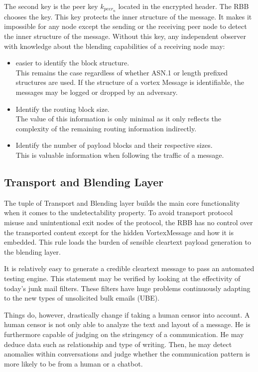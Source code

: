 \documentclass[10pt,journal,compsoc]{IEEEtran}
\begin{document}
The second key is the peer key $k_{peer_n}$ located in the encrypted header. The RBB chooses the key. This key protects the inner structure of the message. It makes it impossible for any node except the sending or the receiving peer node to detect the inner structure of the message. Without this key, any independent observer with knowledge about the blending capabilities of a receiving node may:
\begin{itemize}
	\item easier to identify the block structure.\\ 
	This remains the case regardless of whether ASN.1 or length prefixed structures are used. If the structure of a vortex Message is identifiable, the messages may be logged or dropped by an adversary.
	\item Identify the routing block size.\\
	The value of this information is only minimal as it only reflects the complexity of the remaining routing information indirectly.
	\item Identify the number of payload blocks and their respective sizes. \\
	This is valuable information when following the traffic of a message.
\end{itemize}

\subsection{Transport and Blending Layer\label{sec:transportAndBlending}}
The tuple of Transport and Blending layer builds the main core functionality when it comes to the undetectability property. To avoid transport protocol misuse and unintentional exit nodes of the protocol, the RBB has no control over the transported content except for the hidden VortexMessage and how it is embedded. This rule loads the burden of sensible cleartext payload generation to the blending layer. 

It is relatively easy to generate a credible cleartext message to pass an automated testing engine. This statement may be verified by looking at the effectivity of today's junk mail filters. These filters have huge problems continuously adapting to the new types of unsolicited bulk emails (UBE).

Things do, however, drastically change if taking a human censor into account. A human censor is not only able to analyze the text and layout of a message. He is furthermore capable of judging on the stringency of a communication. He may deduce data such as relationship and type of writing. Then, he may detect anomalies within conversations and judge whether the communication pattern is more likely to be from a human or a chatbot.
\end{document}
